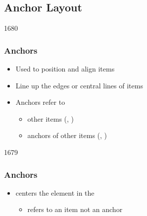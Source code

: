 %
%
%
%

\subsection{Anchor Layout}


\begin{slide}{1680}\frametitle{Anchors}

\begin{itemize}
\item Used to position and align items
\item Line up the edges or central lines of items
\item Anchors refer to
\begin{itemize}
\item other items (, )
\item anchors of other items (, )
\end{itemize}
\end{itemize}


\end{slide}


\begin{slide}{1679}\frametitle{Anchors}


\begin{itemize}
\item {} centers the 
element in the 
  \begin{itemize}
  \item refers to an item not an anchor
  \end{itemize}
\end{itemize}                              
\end{slide}

